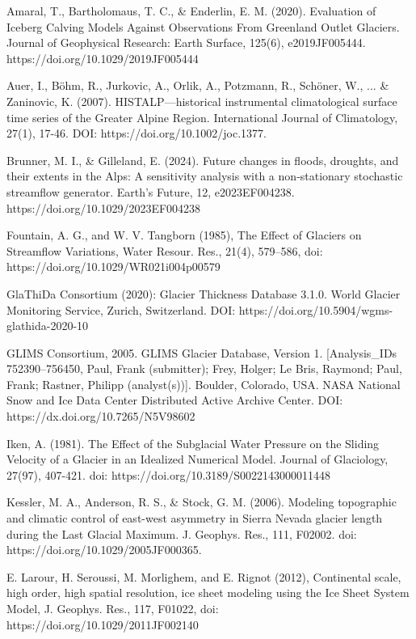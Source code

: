 \documentclass{article}
\begin{document}
\begin{thebibliography}{99}
    Amaral, T., Bartholomaus, T. C., \& Enderlin, E. M. (2020). Evaluation of Iceberg Calving Models Against Observations From Greenland Outlet Glaciers. Journal of Geophysical Research: Earth Surface, 125(6), e2019JF005444. https://doi.org/10.1029/2019JF005444 

    Auer, I., Böhm, R., Jurkovic, A., Orlik, A., Potzmann, R., Schöner, W., ... \& Zaninovic, K. (2007). HISTALP—historical instrumental climatological surface time series of the Greater Alpine Region. International Journal of Climatology, 27(1), 17-46. DOI: https://doi.org/10.1002/joc.1377. 

    Brunner, M. I., \& Gilleland, E. (2024). Future changes in floods, droughts, and their extents in the Alps: A sensitivity analysis with a non‐stationary stochastic streamflow generator. Earth's Future, 12, e2023EF004238. https://doi.org/10.1029/2023EF004238 

    Fountain, A. G., and W. V. Tangborn (1985), The Effect of Glaciers on Streamflow Variations, Water Resour. Res., 21(4), 579–586, doi: https://doi.org/10.1029/WR021i004p00579 

    GlaThiDa Consortium (2020): Glacier Thickness Database 3.1.0. World Glacier Monitoring Service, Zurich, Switzerland. DOI: https://doi.org/10.5904/wgms-glathida-2020-10 

    GLIMS Consortium, 2005. GLIMS Glacier Database, Version 1. [Analysis\_IDs 752390--756450, Paul, Frank (submitter); Frey, Holger; Le Bris, Raymond; Paul, Frank; Rastner, Philipp (analyst(s))]. Boulder, Colorado, USA. NASA National Snow and Ice Data Center Distributed Active Archive Center. DOI: https://dx.doi.org/10.7265/N5V98602 

    Iken, A. (1981). The Effect of the Subglacial Water Pressure on the Sliding Velocity of a Glacier in an Idealized Numerical Model. Journal of Glaciology, 27(97), 407-421. doi: https://doi.org/10.3189/S0022143000011448 

    Kessler, M. A., Anderson, R. S., \& Stock, G. M. (2006). Modeling topographic and climatic control of east-west asymmetry in Sierra Nevada glacier length during the Last Glacial Maximum. J. Geophys. Res., 111, F02002. doi: https://doi.org/10.1029/2005JF000365. 

    E. Larour, H. Seroussi, M. Morlighem, and E. Rignot (2012), Continental scale, high order, high spatial resolution, ice sheet modeling using the Ice Sheet System Model, J. Geophys. Res., 117, F01022, doi: https://doi.org/10.1029/2011JF002140 


\end{thebibliography}
\end{document}
